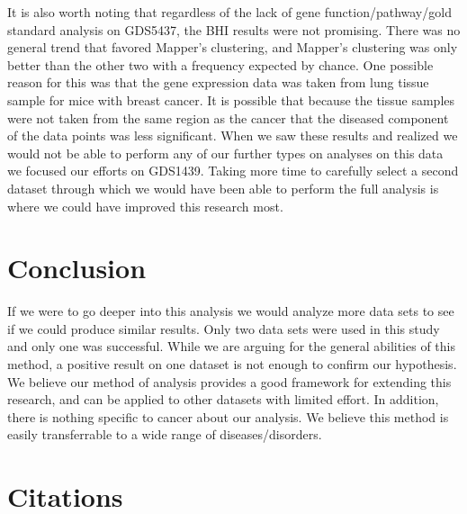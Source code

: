 \documentclass[preprint,10pt]{elsarticle}
\begin{document}
	It is also worth noting that regardless of the lack of gene function/pathway/gold standard analysis on GDS5437, the BHI results were not promising. There was no general trend that favored Mapper's clustering, and Mapper's clustering was only better than the other two with a frequency expected by chance. One possible reason for this was that the gene expression data was taken from lung tissue sample for mice with breast cancer. It is possible that because the tissue samples were not taken from the same region as the cancer that the diseased component of the data points was less significant. When we saw these results and realized we would not be able to perform any of our further types on analyses on this data we focused our efforts on GDS1439. Taking more time to carefully select a second dataset through which we would have been able to perform the full analysis is where we could have improved this research most.


\section{Conclusion}


If we were to go deeper into this analysis we would analyze more data sets to see if we could produce similar results. Only two data sets were used in this study and only one was successful. While we are arguing for the general abilities of this method, a positive result on one dataset is not enough to confirm our hypothesis. We believe our method of analysis provides a good framework for extending this research, and can be applied to other datasets with limited effort. In addition, there is nothing specific to cancer about our analysis. We believe this method is easily transferrable to a wide range of diseases/disorders. 





\section{Citations}
\end{document}
